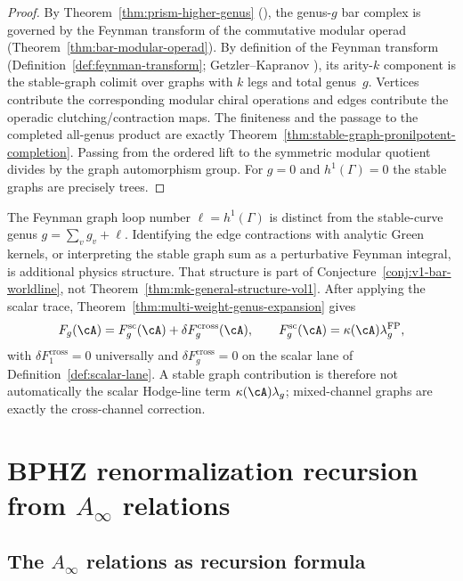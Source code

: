 \begin{proof}
By Theorem~\ref{thm:prism-higher-genus} (\ClaimStatusProvedHere), the
genus-$g$ bar complex is governed by the Feynman transform of the
commutative modular operad
(Theorem~\ref{thm:bar-modular-operad}).  By definition of the Feynman
transform (Definition~\ref{def:feynman-transform}; Getzler--Kapranov
\cite{GeK98}), its arity-$k$ component is the stable-graph colimit
over graphs with $k$ legs and total genus~$g$.  Vertices contribute the
corresponding modular chiral operations and edges contribute the
operadic clutching/contraction maps.  The finiteness and the passage
to the completed all-genus product are exactly
Theorem~\ref{thm:stable-graph-pronilpotent-completion}.  Passing from
the ordered lift to the symmetric modular quotient divides by the graph
automorphism group.  For $g=0$ and $h^1(\Gamma)=0$ the stable graphs
are precisely trees.
\end{proof}

\begin{remark}
\label{rem:feyn-formal-graph-scalar}
The Feynman graph loop number $\ell = h^1(\Gamma)$ is distinct from the
stable-curve genus $g=\sum_v g_v+\ell$.  Identifying the edge
contractions with analytic Green kernels, or interpreting the stable
graph sum as a perturbative Feynman integral, is additional physics
structure.  That structure is part of Conjecture~\ref{conj:v1-bar-worldline},
not Theorem~\ref{thm:mk-general-structure-vol1}.  After applying the
scalar trace, Theorem~\ref{thm:multi-weight-genus-expansion} gives
\[
F_g(\cA)=F_g^{\mathrm{sc}}(\cA)
+\delta F_g^{\mathrm{cross}}(\cA),
\qquad
F_g^{\mathrm{sc}}(\cA)=\kappa(\cA)\lambda_g^{\mathrm{FP}},
\]
with $\delta F_1^{\mathrm{cross}}=0$ universally and
$\delta F_g^{\mathrm{cross}}=0$ on the scalar lane of
Definition~\ref{def:scalar-lane}.  A stable graph contribution is
therefore not automatically the scalar Hodge-line term
$\kappa(\cA)\lambda_g$; mixed-channel graphs are exactly the
cross-channel correction.
\end{remark}

\section{\texorpdfstring{BPHZ renormalization recursion from $A_\infty$ relations}{BPHZ renormalization recursion from A infty relations}}
\label{sec:bphz-ainfinity}

\subsection{\texorpdfstring{The $A_\infty$ relations as recursion formula}{The A infty relations as recursion formula}}

